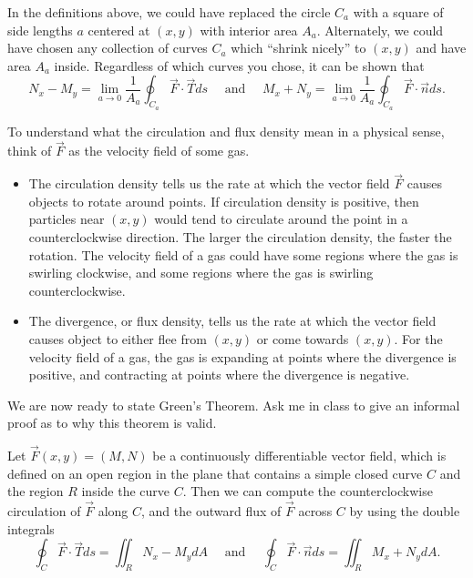 In the definitions above, we could have replaced the circle $C_a$ with a square of side lengths $a$ centered at $(x,y)$ with interior area $A_a$. Alternately, we could have chosen any collection of curves $C_a$ which ``shrink nicely'' to $(x,y)$ and have area $A_a$ inside. Regardless of which curves you chose, it can be shown that 
$$N_x-M_y=\lim_{a\to 0} \frac{1}{A_a}\oint_{C_a} \vec F \cdot \vec T ds \quad \text{ and } \quad M_x+N_y=\lim_{a\to 0} \frac{1}{A_a}\oint_{C_a} \vec F \cdot \vec n ds.$$

To understand what the circulation and flux density mean in a physical sense, think of $\vec F$ as the velocity field of some gas.  
\begin{itemize}
 \item The circulation density tells us the rate at which the vector field $\vec F$ causes objects to rotate around points.  If circulation density is positive, then particles near $(x,y)$ would tend to circulate around the point in a counterclockwise direction. The larger the circulation density, the faster the rotation. The velocity field of a gas could have some regions where the gas is swirling clockwise, and some regions where the gas is swirling counterclockwise.
 \item The divergence, or flux density, tells us the rate at which the vector field causes object to either flee from $(x,y)$ or come towards $(x,y)$. For the velocity field of a gas, the gas is expanding at points where the divergence is positive, and contracting at points where the divergence is negative. 
\end{itemize}


We are now ready to state Green's Theorem.  Ask me in class to give an informal proof as to why this theorem is valid.
\begin{theorem}
 Let $\vec F(x,y)=(M,N)$ be a continuously differentiable vector field, which is defined on an open region in the plane that contains a simple closed curve $C$ and the region $R$ inside the curve $C$.  Then we can compute the counterclockwise circulation of $\vec F$ along $C$, and the outward flux of $\vec F$ across $C$ by using the double integrals
$$ \oint_{C} \vec F \cdot \vec T ds=\iint_R N_x-M_y dA 
\quad \text{ and } \quad 
\oint_{C} \vec F \cdot \vec n ds=\iint_R M_x+N_y dA.$$
\end{theorem}


